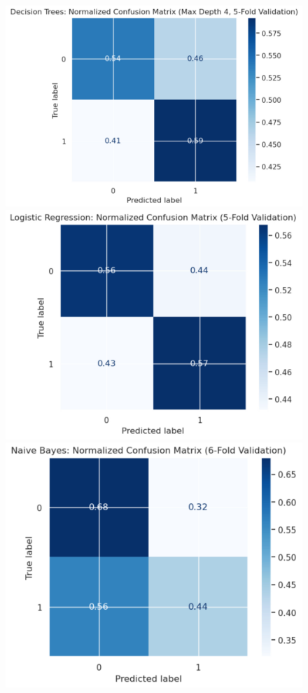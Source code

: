 \documentclass{article}
\begin{document}
\begin{figure}[htbp]
\centering
\begin{minipage}{.3\textwidth}
  \centering
  \includegraphics[width=1.03\linewidth]{Figures/DT_cm.png}
\end{minipage}%
\begin{minipage}{.3\textwidth}
  \centering
  \includegraphics[width=.9\linewidth]{Figures/LR_cm.png}
\end{minipage}
\begin{minipage}{.3\textwidth}
  \centering
  \includegraphics[width=.85\linewidth]{Figures/NB_cm.png}

\end{minipage}
\end{figure}
\end{document}
